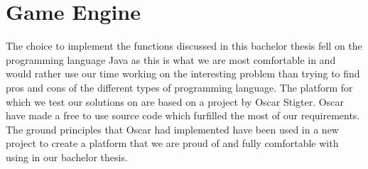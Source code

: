\section{Game Engine}
The choice to implement the functions discussed in this bachelor thesis fell on the programming language Java as this is what we are most comfortable in and would rather use our time working on the interesting problem than trying to find pros and cons of the different types of programming language.
The platform for which we test our solutions on are based on a project by Oscar Stigter. Oscar have made a free to use source code which furfilled the most of our requirements. The ground principles that Oscar had implemented have been used in a new project to create a platform that we are proud of and fully comfortable with using in our bachelor thesis.
